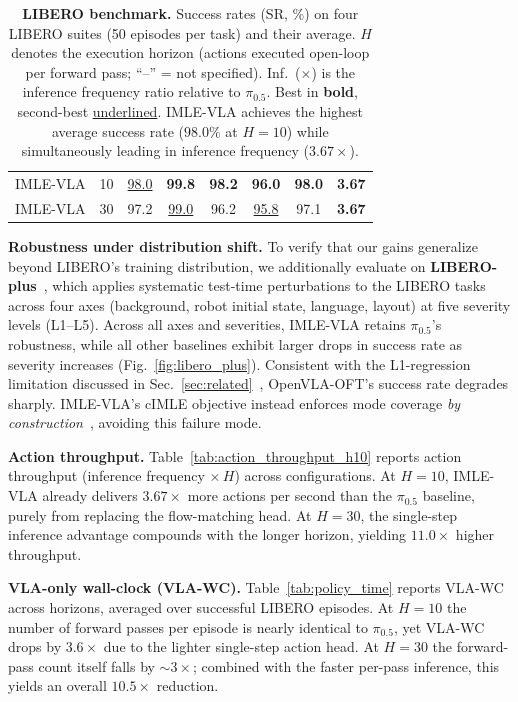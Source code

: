 \documentclass[letterpaper, 10 pt, conference]{ieeeconf}  %
\newcommand{\best}[1]{\textbf{#1}}
\newcommand{\second}[1]{\underline{#1}}
\begin{document}
\begin{table}[t]
\begin{tabular}{lrcccccc}
\midrule

IMLE-VLA & 10 & \second{98.0} & \best{99.8} & \best{98.2} & \best{96.0} & \best{98.0} & \best{3.67} \\
IMLE-VLA & 30 & 97.2 & \second{99.0} & 96.2 & \second{95.8} & 97.1 & \best{3.67} \\

\bottomrule
\end{tabular}
\vspace{0.0em}
\caption{\textbf{LIBERO benchmark.} Success rates (SR, \%) on four LIBERO suites (50 episodes per task) and their average. $H$ denotes the execution horizon (actions executed open-loop per forward pass; ``--'' = not specified). Inf.\ ($\times$) is the inference frequency ratio relative to $\pi_{0.5}$. Best in \textbf{bold}, second-best \underline{underlined}. IMLE-VLA achieves the highest average success rate ($98.0\%$ at $H{=}10$) while simultaneously leading in inference frequency ($3.67\times$).}
\label{tab:libero_success_horizon}
\end{table}

\textbf{Robustness under distribution shift.} To verify that our gains generalize beyond LIBERO's training distribution, we additionally evaluate on \textbf{LIBERO-plus}~\cite{fei25libero-plus}, which applies systematic test-time perturbations to the LIBERO tasks across four axes (background, robot initial state, language, layout) at five severity levels (L1--L5). Across all axes and severities, IMLE-VLA retains $\pi_{0.5}$'s robustness, while all other baselines exhibit larger drops in success rate as severity increases (Fig.~\ref{fig:libero_plus}). Consistent with the L1-regression limitation discussed in Sec.~\ref{sec:related}~\cite{kim2025openvlaoft}, OpenVLA-OFT's success rate degrades sharply. IMLE-VLA's cIMLE objective instead enforces mode coverage \emph{by construction}~\cite{imle}, avoiding this failure mode.

\textbf{Action throughput.}
Table~\ref{tab:action_throughput_h10} reports action throughput (inference frequency $\times\,H$) across configurations. At $H{=}10$, IMLE-VLA already delivers $3.67\times$ more actions per second than the $\pi_{0.5}$ baseline, purely from replacing the flow-matching head. At $H{=}30$, the single-step inference advantage compounds with the longer horizon, yielding $11.0\times$ higher throughput.


\textbf{VLA-only wall-clock (VLA-WC).} Table~\ref{tab:policy_time} reports VLA-WC across horizons, averaged over successful LIBERO episodes. At $H{=}10$ the number of forward passes per episode is nearly identical to $\pi_{0.5}$, yet VLA-WC drops by $3.6\times$ due to the lighter single-step action head. At $H{=}30$ the forward-pass count itself falls by ${\sim}3\times$; combined with the faster per-pass inference, this yields an overall $10.5\times$ reduction.
\end{document}
